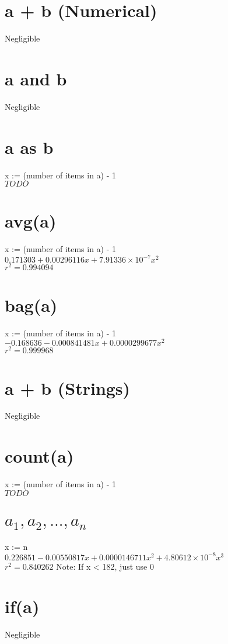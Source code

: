 \documentclass[12pt]{article}
\begin{document}
	\section{a + b (Numerical)}
	Negligible
	
	\section{a and b}
	Negligible
	
	\section{a as b}
	x := (number of items in a) - 1\\
	$TODO$
	
	\section{avg(a)}
	x := (number of items in a) - 1\\
	$0.171303 + 0.00296116x + 7.91336 \times 10^{-7} x^2$\\
	$r^2 = 0.994094$

	\section{bag(a)}
	x := (number of items in a) - 1\\
	$-0.168636 - 0.000841481x + 0.0000299677x^2$\\
	$r^2 = 0.999968$
	
	\section{a + b (Strings)}
	Negligible
	
	\section{count(a)}
	x := (number of items in a) - 1\\
	$TODO$
	
	\section{$a_1, a_2, ..., a_n$}
	x := n\\
	$0.226851 - 0.00550817x + 0.0000146711x^2 + 4.80612 \times 10^{-8} x^3$\\
	$r^2 = 0.840262$
	Note: If x < 182, just use 0
	
	\section{if(a)}
	Negligible
	
\end{document}
